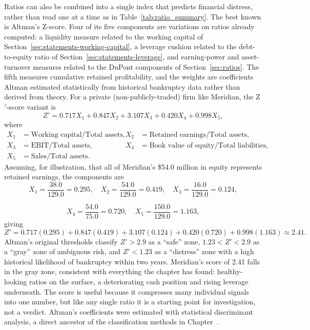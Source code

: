 \documentclass[../ai_in_finance]{subfiles}
\begin{document}
Ratios can also be combined into a single index that predicts financial distress, rather than read one at a time as in Table~\ref{tab:ratio_summary}. The best known is Altman's Z-score. Four of its five components are variations on ratios already computed: a liquidity measure related to the working capital of Section~\ref{sec:statements-working-capital}, a leverage cushion related to the debt-to-equity ratio of Section~\ref{sec:statements-leverage}, and earning-power and asset-turnover measures related to the DuPont components of Section~\ref{sec:ratios}. The fifth measures cumulative retained profitability, and the weights are coefficients Altman estimated statistically from historical bankruptcy data rather than derived from theory. For a private (non-publicly-traded) firm like Meridian, the Z$'$-score variant is
\begin{equation}
Z' = 0.717 X_1 + 0.847 X_2 + 3.107 X_3 + 0.420 X_4 + 0.998 X_5,\label{eq:statements-altman-z}
\end{equation}
where
\begin{align*}
X_1 &= \text{Working capital}/\text{Total assets}, & X_2 &= \text{Retained earnings}/\text{Total assets}, \\
X_3 &= \text{EBIT}/\text{Total assets}, & X_4 &= \text{Book value of equity}/\text{Total liabilities}, \\
X_5 &= \text{Sales}/\text{Total assets}. & &
\end{align*}
Assuming, for illustration, that all of Meridian's \$54.0 million in equity represents retained earnings, the components are
\begin{equation*}
X_1 = \frac{38.0}{129.0} = 0.295, \quad X_2 = \frac{54.0}{129.0} = 0.419, \quad X_3 = \frac{16.0}{129.0} = 0.124,
\end{equation*}

\begin{equation*}
X_4 = \frac{54.0}{75.0} = 0.720, \quad X_5 = \frac{150.0}{129.0} = 1.163,
\end{equation*}
giving
\begin{equation*}
Z' = 0.717(0.295) + 0.847(0.419) + 3.107(0.124) + 0.420(0.720) + 0.998(1.163) \approx 2.41.
\end{equation*}
Altman's original thresholds classify $Z' > 2.9$ as a ``safe'' zone, $1.23 < Z' < 2.9$ as a ``gray'' zone of ambiguous risk, and $Z' < 1.23$ as a ``distress'' zone with a high historical likelihood of bankruptcy within two years. Meridian's score of 2.41 falls in the gray zone, consistent with everything the chapter has found: healthy-looking ratios on the surface, a deteriorating cash position and rising leverage underneath. The score is useful because it compresses many individual signals into one number, but like any single ratio it is a starting point for investigation, not a verdict. Altman's coefficients were estimated with statistical discriminant analysis, a direct ancestor of the classification methods in Chapter~.
\end{document}
